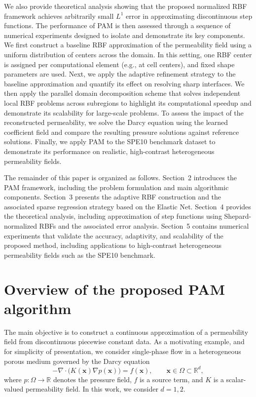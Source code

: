 \documentclass[final,1p,times]{elsarticle}
\theoremstyle{plain}
\theoremstyle{definition}
\theoremstyle{remark}
\newcommand{\bx}{\mathbf{x}}
\begin{document}
We also provide theoretical analysis showing that the proposed normalized RBF framework achieves arbitrarily small $L^1$ error in approximating discontinuous step functions. The performance of PAM is then assessed through a sequence of numerical experiments designed to isolate and demonstrate its key components. We first construct a baseline RBF approximation of the permeability field using a uniform distribution of centers across the domain. In this setting, one RBF center is assigned per computational element (e.g., at cell centers), and fixed shape parameters are used. Next, we apply the adaptive refinement strategy to the baseline approximation and quantify its effect on resolving sharp interfaces. We then apply the parallel domain decomposition scheme that solves independent local RBF problems across subregions to highlight its computational speedup and demonstrate its scalability for large-scale problems. To assess the impact of the reconstructed permeability, we solve the Darcy equation using the learned coefficient field and compare the resulting pressure solutions against reference solutions. Finally, we apply PAM to the SPE10 benchmark dataset \cite{christie2001tenth} to demonstrate its performance on realistic, high-contrast heterogeneous permeability fields.

The remainder of this paper is organized as follows. Section~2 introduces the PAM framework, including the problem formulation and main algorithmic components. Section~3 presents the adaptive RBF construction and the associated sparse regression strategy based on the Elastic Net. Section~4 provides the theoretical analysis, including approximation of step functions using Shepard-normalized RBFs and the associated error analysis. Section~5 contains numerical experiments that validate the accuracy, adaptivity, and scalability of the proposed method, including applications to high-contrast heterogeneous permeability fields such as the SPE10 benchmark.







\section{Overview of the proposed PAM algorithm}
\label{sec:2}

The main objective is to construct a continuous approximation of a permeability field from discontinuous piecewise constant data. 
As a motivating example, and for simplicity of presentation, we consider
single-phase flow in a heterogeneous porous medium governed by the Darcy equation
\begin{equation}
-\nabla \cdot \bigl(K(\bx)\nabla p(\bx)\bigr) = f(\bx),
\qquad \bx \in \Omega \subset \mathbb{R}^d,
\end{equation}
where $p:\Omega\to\mathbb{R}$ denotes the pressure field, $f$ is a source term,
and $K$ is a scalar-valued permeability field. In this work, we consider
$d=1,2$.
\end{document}
